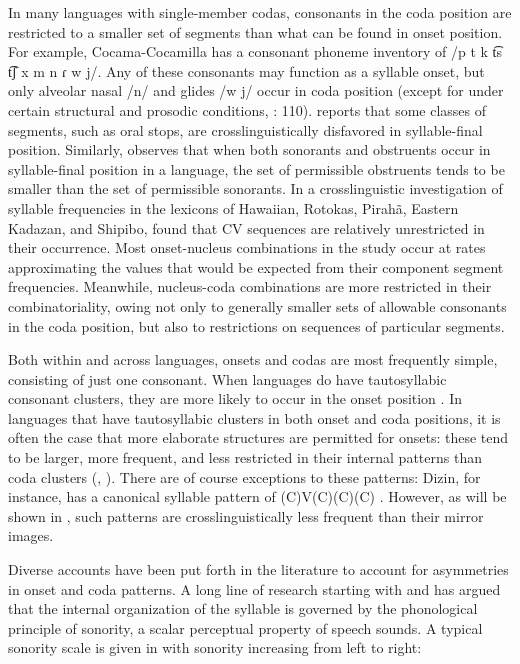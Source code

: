   In many languages with single-member codas, consonants in the coda position are restricted to a smaller set of segments than what can be found in onset position. For example, Cocama-Cocamilla has a consonant phoneme inventory of /p t k t͡s t͡ʃ x m n ɾ w j/. Any of these consonants may function as a syllable onset, but only alveolar nasal /n/ and glides /w j/ occur in coda position (except for under certain structural and prosodic conditions,  \citealt{VallejosYopán2010}: 110). \citet{Krakow1999} reports that some classes of segments, such as oral stops, are crosslinguistically disfavored in syllable-final position. Similarly, \citet[301]{Clements1990} observes that when both sonorants and obstruents occur in syllable-final position in a language, the set of permissible obstruents tends to be smaller than the set of permissible sonorants. In a crosslinguistic investigation of syllable frequencies in the lexicons of Hawaiian, Rotokas, Pirahã, Eastern Kadazan, and Shipibo, \citet{MaddiesonPrecoda1992} found that CV sequences are relatively unrestricted in their occurrence. Most onset-nucleus combinations in the study occur at rates approximating the values that would be expected from their component segment frequencies. Meanwhile, nucleus-coda combinations are more restricted in their combinatoriality, owing not only to generally smaller sets of allowable consonants in the coda position, but also to restrictions on sequences of particular segments.

  Both within and across languages, onsets and codas are most frequently simple, consisting of just one consonant. When languages do have tautosyllabic consonant clusters, they are more likely to occur in the onset position \citep{Blevins2006}. In languages that have tautosyllabic clusters in both onset and coda positions, it is often the case that more elaborate structures are permitted for onsets: these tend to be larger, more frequent, and less restricted in their internal patterns than coda clusters (\citealt{Greenberg19651978}, \citealt{Blevins2006}). There are of course exceptions to these patterns: Dizin, for instance, has a canonical syllable pattern of (C)V(C)(C)(C) \citep{Beachy2005}. However, as will be shown in , such patterns are crosslinguistically less frequent than their mirror images.

  Diverse accounts have been put forth in the literature to account for asymmetries in onset and coda patterns. A long line of research starting with \citet{Sievers1881} and \citet{Jespersen1904} has argued that the internal organization of the syllable is governed by the phonological principle of sonority, a scalar perceptual property of speech sounds. A typical sonority scale is given in  with sonority increasing from left to right:

